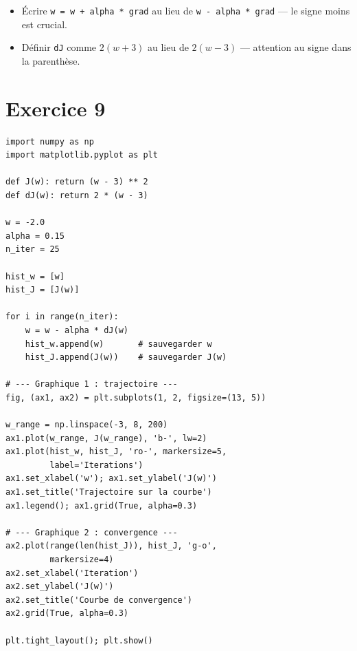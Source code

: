 \begin{attentionbox}
    \begin{itemize}
        \item \'{E}crire \texttt{w = w + alpha * grad} au lieu de \texttt{w - alpha * grad} --- le signe moins est crucial.
        \item D\'{e}finir \texttt{dJ} comme $2(w + 3)$ au lieu de $2(w - 3)$ --- attention au signe dans la parenth\`{e}se.
    \end{itemize}
\end{attentionbox}

\section*{Exercice 9 \hfill \exointermediaire}

\separateur

\begin{pythonbox}
\begin{lstlisting}
import numpy as np
import matplotlib.pyplot as plt

def J(w): return (w - 3) ** 2
def dJ(w): return 2 * (w - 3)

w = -2.0
alpha = 0.15
n_iter = 25

hist_w = [w]
hist_J = [J(w)]

for i in range(n_iter):
    w = w - alpha * dJ(w)
    hist_w.append(w)       # sauvegarder w
    hist_J.append(J(w))    # sauvegarder J(w)

# --- Graphique 1 : trajectoire ---
fig, (ax1, ax2) = plt.subplots(1, 2, figsize=(13, 5))

w_range = np.linspace(-3, 8, 200)
ax1.plot(w_range, J(w_range), 'b-', lw=2)
ax1.plot(hist_w, hist_J, 'ro-', markersize=5,
         label='Iterations')
ax1.set_xlabel('w'); ax1.set_ylabel('J(w)')
ax1.set_title('Trajectoire sur la courbe')
ax1.legend(); ax1.grid(True, alpha=0.3)

# --- Graphique 2 : convergence ---
ax2.plot(range(len(hist_J)), hist_J, 'g-o',
         markersize=4)
ax2.set_xlabel('Iteration')
ax2.set_ylabel('J(w)')
ax2.set_title('Courbe de convergence')
ax2.grid(True, alpha=0.3)

plt.tight_layout(); plt.show()
\end{lstlisting}
\end{pythonbox}

